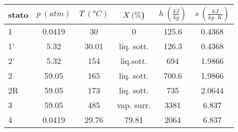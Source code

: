 \begin{center}
    \begin{tabular}{l|c|c|c|c|c}
        stato    & $p\ (atm)$ & $T\ (\text{°}C) $&$X\ (\%$)& $h\ (\frac{kJ}{kg})$  & $s\ (\frac{kJ}{kg\cdot K})$\\ \hline
        1   &        0.0419 &            30   &    0      & 125.6    &0.4368 \\ \hline     %
        1'  &        5.32    &           30.01   &liq. sott.  & 126.3&0.4368 \\ \hline      %
        2'  &          5.32  &         154&liq.sott.            &694&1.9866  \\ \hline      %
        2   &          59.05&           165&liq. sott.      &700.6& 1.9866   \\ \hline      %
        2R  &       59.05   &           173     &liq. sott. &  735  & 2.0644 \\ \hline      %
        3   &        59.05  &            485&  vap. surr.    &  3381 &6.837  \\ \hline      %
        4   &        0.0419       &      29.76&     79.81 &    2064  &6.837                %
    \end{tabular}
\end{center}
